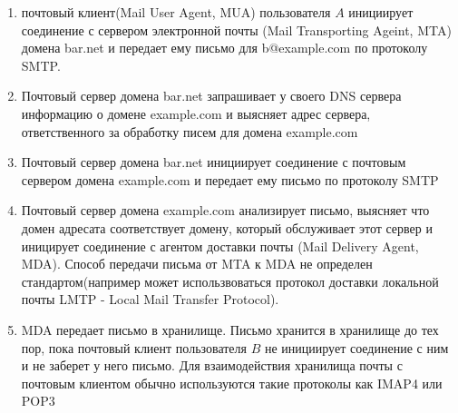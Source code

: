 \begin{enumerate}
\item почтовый клиент(Mail User Agent, MUA) пользователя $A$ инициирует соединение с сервером электронной почты (Mail Transporting Ageint, MTA) домена bar.net и передает ему письмо для b@example.com по протоколу SMTP.
\item Почтовый сервер домена bar.net запрашивает у своего DNS сервера информацию о домене example.com и выясняет адрес сервера, ответственного за обработку писем для домена example.com
\item Почтовый сервер домена bar.net инициирует соединение с почтовым сервером домена example.com и передает ему письмо по протоколу SMTP
\item Почтовый сервер домена example.com анализирует письмо, выясняет что домен адресата соответствует домену, который обслуживает этот сервер и иницирует соединение с агентом доставки почты (Mail Delivery Agent, MDA). Способ передачи письма от MTA к MDA не определен стандартом(например может использвоваться протокол доставки локальной почты LMTP - Local Mail Transfer Protocol).
\item MDA передает письмо в хранилище. Письмо хранится в хранилище до тех пор, пока почтовый клиент пользователя $B$ не инициирует соединение с ним и не заберет у него письмо. Для взаимодействия хранилища почты с почтовым клиентом обычно используются такие протоколы как IMAP4 или POP3
\end{enumerate}

